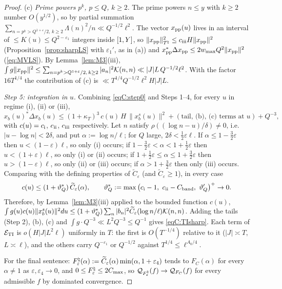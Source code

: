 \begin{proof}
(c) \emph{Prime powers $p^k$, $p\le Q$, $k\ge2$.} The prime powers $n\le y$ with $k\ge2$ number $O(y^{1/2})$, so by partial summation
$\sum_{n=p^k>Q^{1+\varepsilon}/2,\,k\ge2}\Lambda(n)^2/n\ll Q^{-1/2}\ell^2$. The vector $x_{\rm pp}(u)$ lives in an interval of $\le K(u)\le Q^{2-\varepsilon_1}$
integers inside $[1,Y]$, so $\|x_{\rm pp}\|_{T^\natural}^2\le c_{\rm iii}H\|x_{\rm pp}\|^2$ (Proposition~\ref{prop:sharpLS} with $\varepsilon_1'$, as in (a)) and
$x_{\rm pp}^*\Delta x_{\rm pp}\le2w_{\max}Q^2\|x_{\rm pp}\|^2$ (\eqref{eq:MVLS}). By Lemma~\ref{lem:M3}(iii),
$\int g\|x_{\rm pp}\|^2\le\sum_{n=p^k>Q^{1+\varepsilon}/2,\,k\ge2}|a_n|^2\mathcal{K}(n,n)\ll|J|L\,Q^{-1/2}\ell^2$. With the factor $16T^{1/4}$ the
contribution of (c) is $\ll T^{1/4}Q^{-1/2}\ell^2H|J|L$.

\emph{Step 5: integration in $u$.} Combining \eqref{eqC:step0} and Steps 1--4, for every $u$ in regime (i), (ii) or (iii),
\[
 x_b(u)^*\Delta x_b(u)\le(1+\kappa_T)^3\,c(u)\,H\,\|x_b^s(u)\|^2+(\text{tail, (b), (c) terms at }u)+Q^{-3},
\]
with $c(u)=c_{\rm i}$, $c_{\rm ii}$, $c_{\rm iii}$ respectively. Let $n$ satisfy $\rho((\log n-u)/\delta)\ne0$, i.e.\ $|u-\log n|<2\delta$, and put
$\alpha:=\log n/\ell$; for $Q$ large, $2\delta<\frac12\varepsilon\ell$. If $\alpha\le1-\frac32\varepsilon$ then $u<(1-\varepsilon)\ell$, so only (i) occurs; if
$1-\frac32\varepsilon<\alpha<1+\frac12\varepsilon$ then $u<(1+\varepsilon)\ell$, so only (i) or (ii) occurs; if $1+\frac12\varepsilon\le\alpha\le1+\frac32\varepsilon$ then
$u>(1-\varepsilon)\ell$, so only (ii) or (iii) occurs; if $\alpha>1+\frac32\varepsilon$ then only (iii) occurs. Comparing with the defining properties of
$\widetilde C_\varepsilon$ (and $\widetilde C_\varepsilon\ge1$), in every case
\[
 c(u)\le(1+\vartheta^*_Q)\,\widetilde C_\varepsilon(\alpha),\qquad \vartheta^*_Q:=\max\big(c_{\rm i}-1,\ c_{\rm ii}-C_{\rm band},\ \vartheta'_Q\big)^+\to0 .
\]
Therefore, by Lemma~\ref{lem:M3}(iii) applied to the bounded function $c(u)$,
$\int g(u)c(u)\|x_b^s(u)\|^2du\le(1+\vartheta^*_Q)\sum_n|b_n|^2\widetilde C_\varepsilon(\log n/\ell)\mathcal{K}(n,n)$. Adding the tails (Step 2), (b), (c) and
$\int g\cdot Q^{-3}\ll L^2Q^{-3}\le Q^{-1}$ gives \eqref{eqC:TIsharp}. Each term of $\mathcal E_{\rm TI}$ is $o(H|J|L^2\ell)$ uniformly in $T$: the
first is $O(T^{-1/4})$ relative to it ($|J|\asymp T$, $L\asymp\ell$), and the others carry $Q^{-\varepsilon_1}$ or $Q^{-1/2}$ against $T^{1/4}\le\ell^{A_0/4}$.

For the final sentence: $F^\natural_\varepsilon(\alpha):=\widetilde C_\varepsilon(\alpha)\min(\alpha,1+\varepsilon_4)$ tends to $F_C(\alpha)$ for every $\alpha\ne1$ as
$\varepsilon,\varepsilon_4\to0$, and $0\le F^\natural_\varepsilon\le2C_{\max}$, so $\mathcal Q_{F^\natural_\varepsilon}(f)\to\mathcal Q_{F_C}(f)$ for every admissible $f$ by
dominated convergence.
\end{proof}

